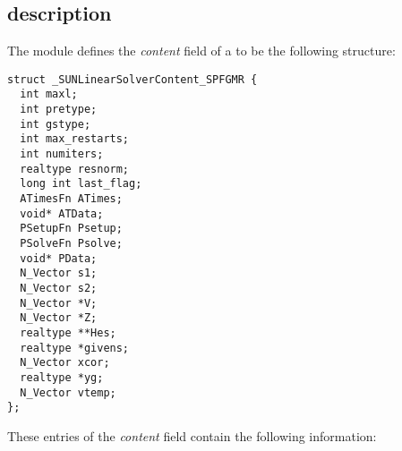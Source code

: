 \subsection{{\sunlinsolspfgmr} description}\label{ss:sunlinsol_spfgmr_description}


The {\sunlinsolspfgmr} module defines the {\em content} field of a
 to be the following structure:
\begin{verbatim}
struct _SUNLinearSolverContent_SPFGMR {
  int maxl;
  int pretype;
  int gstype;
  int max_restarts;
  int numiters;
  realtype resnorm;
  long int last_flag;
  ATimesFn ATimes;
  void* ATData;
  PSetupFn Psetup;
  PSolveFn Psolve;
  void* PData;
  N_Vector s1;
  N_Vector s2;
  N_Vector *V;
  N_Vector *Z;
  realtype **Hes;
  realtype *givens;
  N_Vector xcor;
  realtype *yg;
  N_Vector vtemp;
};
\end{verbatim}
These entries of the \emph{content} field contain the following
information:
